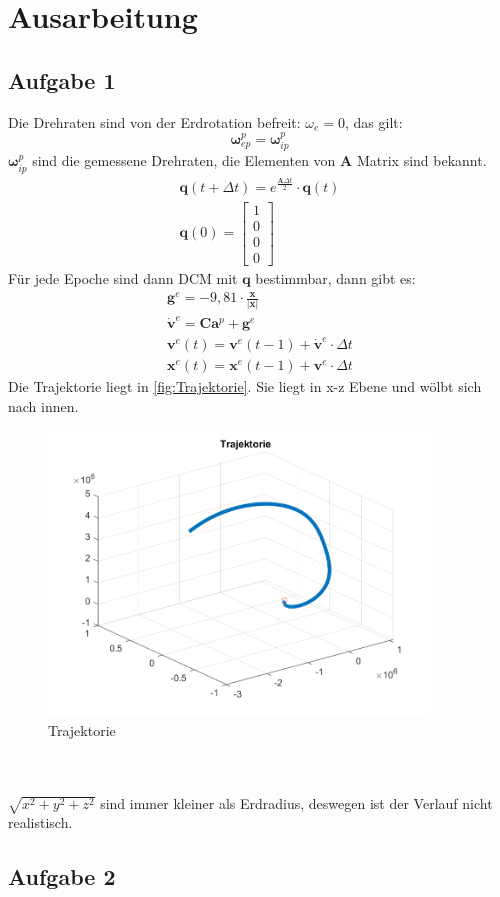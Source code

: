 \chapter{Ausarbeitung}
\section{Aufgabe 1}
Die Drehraten sind von der Erdrotation befreit: $\omega_e = 0$, das gilt:
\begin{equation*}
	\bm{\omega}_{ep}^p = \bm{\omega}_{ip}^p
\end{equation*}
$\bm{\omega}_{ip}^p$ sind die gemessene Drehraten, die Elementen von $\bm{A}$ Matrix sind bekannt. 
\begin{gather*}
	\bm{q}(t+\Delta t) = e^{\frac{\bm{A} \Delta t}{2}} \cdot \bm{q}(t) \\
	\bm{q}(0) = \begin{bmatrix}
		1 \\
		0 \\
		0 \\
		0
	\end{bmatrix}
\end{gather*}
Für jede Epoche sind dann DCM mit $\bm{q}$ bestimmbar, dann gibt es:
\begin{gather*}
	\bm{g}^{e} = -9,81 \cdot \frac{\bm{x}}{|\bm{x}|} \\
	\dot{\bm{v}}^{e} = \bm{C} \bm{a}^{p} + \bm{g}^{e} \\
	\bm{v}^{e}(t) = \bm{v}^{e}(t-1) + \dot{\bm{v}}^{e} \cdot \Delta t \\
	\bm{x}^{e}(t) = \bm{x}^{e}(t-1) + \bm{v}^{e} \cdot \Delta t
\end{gather*}
Die Trajektorie liegt in \autoref{fig:Trajektorie}. Sie liegt in x-z Ebene und wölbt sich nach innen. 
\begin{figure}[htbp]
	\centering
	\includegraphics[width=0.9\textwidth]{images/Trajektorie} 
	\caption{Trajektorie} 
	\label{fig:Trajektorie}
\end{figure}\\\\
$\sqrt{x^2 + y^2 + z^2}$ sind immer kleiner als Erdradius, deswegen ist der Verlauf nicht realistisch.
\clearpage
\section{Aufgabe 2}

















